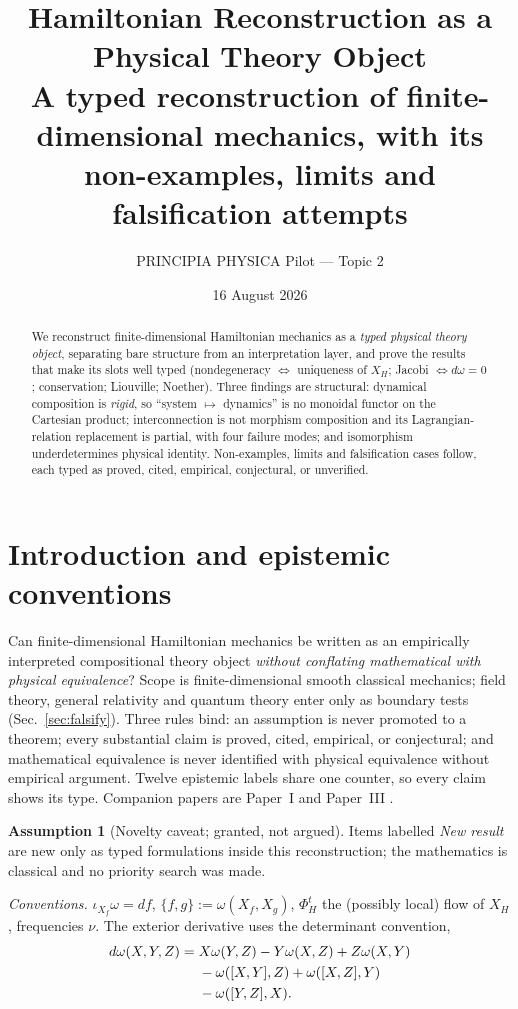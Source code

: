 \documentclass[12pt,a4paper]{article}
\title{\bf Hamiltonian Reconstruction as a Physical Theory Object\\[2pt]
\large A typed reconstruction of finite-dimensional mechanics, with its
non-examples, limits and falsification attempts}
\author{PRINCIPIA PHYSICA Pilot --- Topic 2}
\date{16 August 2026}
\theoremstyle{definition}
\newtheorem{assumption}[definition]{Assumption}
\theoremstyle{plain}
\theoremstyle{commentary}
\newcommand{\pb}[2]{\{#1,#2\}}
\begin{document}
\maketitle
\begin{abstract}
\noindent
We reconstruct finite-dimensional Hamiltonian mechanics as a \emph{typed physical theory object},
separating bare structure from an interpretation layer, and prove the results that make its slots
well typed (nondegeneracy $\Leftrightarrow$ uniqueness of $X_H$; Jacobi $\Leftrightarrow d\omega=0$;
conservation; Liouville; Noether). Three findings are structural: dynamical composition is
\emph{rigid}, so ``system $\mapsto$ dynamics'' is no monoidal functor on the Cartesian product;
interconnection is not morphism composition and its Lagrangian-relation replacement is partial, with
four failure modes; and isomorphism underdetermines physical identity. Non-examples, limits and
falsification cases follow, each typed as proved, cited, empirical, conjectural, or unverified.
\end{abstract}

\section{Introduction and epistemic conventions}
\label{sec:intro}

Can finite-dimensional Hamiltonian mechanics be written as an empirically interpreted compositional
theory object \emph{without conflating mathematical with physical equivalence}? Scope is
finite-dimensional smooth classical mechanics; field theory, general relativity and quantum theory
enter only as boundary tests (Sec.~\ref{sec:falsify}). Three rules bind: an assumption is never
promoted to a theorem; every substantial claim is proved, cited, empirical, or conjectural; and
mathematical equivalence is never identified with physical equivalence without empirical argument.
Twelve epistemic labels share one counter, so every claim shows its type. Companion papers are
Paper~I \cite{PaperI} and Paper~III \cite{PaperIII}.

\begin{assumption}[Novelty caveat; granted, not argued]\label{as:novelty}
Items labelled \emph{New result} are new only as typed formulations inside this reconstruction; the
mathematics is classical and no priority search was made.
\end{assumption}

\noindent\emph{Conventions.} $\iota_{X_f}\omega=df$, $\pb{f}{g}:=\omega(X_f,X_g)$, $\Phi^t_H$ the
(possibly local) flow of $X_H$, frequencies $\nu$. The exterior derivative uses the determinant
convention,
\begin{align}\label{eq:dconv}
d\omega(X,Y,Z)={}&X\omega(Y,Z)-Y\omega(X,Z)+Z\omega(X,Y)\notag\\
&-\omega([X,Y],Z)+\omega([X,Z],Y)\notag\\
&-\omega([Y,Z],X).
\end{align}
\end{document}
